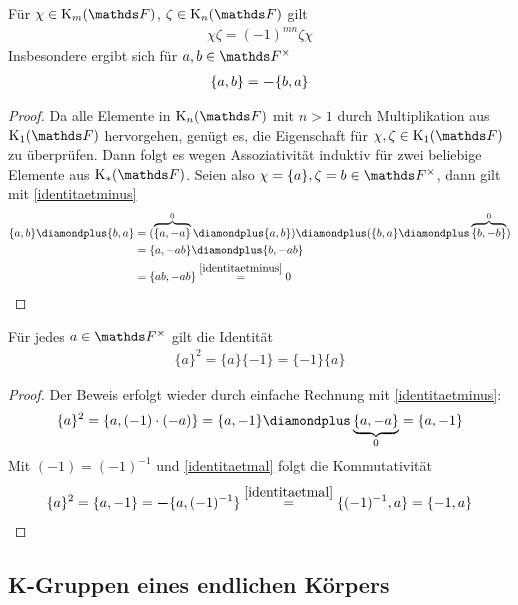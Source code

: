 \documentclass[ngerman,fontsize=11pt, paper=a4, parskip=half, titlepage=true, toc=bib]{scrartcl}
\begin{document}
\begin{Lem}\label{identitaetmal}
  Für $\chi\in\K_m(\F)$, $\zeta\in\K_n(\F)$ gilt
  \begin{gather*}
    \chi\zeta=(-1)^{mn}\zeta\chi
  \end{gather*}
  Insbesondere ergibt sich für $a,b\in \Fx$
  \begin{gather*}
    \{a,b\}= \boldsymbol -\{b,a\}
  \end{gather*}
  \begin{proof}
    Da alle Elemente in $\KnF$ mit $n>1$ durch Multiplikation aus
    $\KoF$ hervorgehen, genügt es, die Eigenschaft für
    $\chi,\zeta\in\KoF$ zu überprüfen. Dann folgt es wegen
    Assoziativität induktiv für zwei beliebige Elemente aus $\KF$.
    Seien also $\chi=\{a\},\zeta=b\in\Fx$, dann gilt mit \ref{identitaetminus}
    \begin{align*}
      \{a,b\}\p \{b,a\} 
      &= (\overbrace{\{a,-a\}}^{0} \p \{a,b\} )
        \p (\{b,a\} \p \overbrace{\{b,-b\}}^{0} ) \\
      &= \{ a,-ab \} \p \{b, -ab\}\\
      &= \{ ab, -ab\} \overset{\ref{identitaetminus}}{=} 0
    \end{align*}
  \end{proof}
\end{Lem}

\begin{Lem}\label{identitaetquadrat}
  Für jedes $a\in \Fx$ gilt die Identität
  \begin{gather*}
    \{a\}^2 = \{a\}\{-1\} = \{-1\}\{a\}
  \end{gather*}
  \begin{proof}
    Der Beweis erfolgt wieder durch einfache Rechnung mit
    \ref{identitaetminus}:
    \begin{gather*}
      \{a\}^2 = \{a,(-1)\cdot (-a)\} 
      = \{a,-1\}\p\underbrace{\{a,-a\}}_{0} = \{a,-1\}
    \end{gather*}
    Mit $(-1)=(-1)^{-1}$ und \ref{identitaetmal} folgt die Kommutativität
    \begin{gather*}
      \{a\}^2 = \{a,-1\}= \boldsymbol -\{a,(-1)^{-1}\} 
      \overset{\ref{identitaetmal}}{=} \{(-1)^{-1},a\} = \{-1,a\}
    \end{gather*}
  \end{proof}
\end{Lem}


\subsection{K-Gruppen eines endlichen Körpers}
\end{document}
